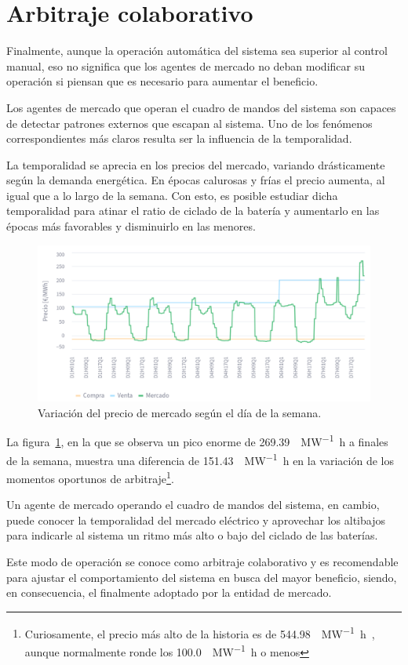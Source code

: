 \section{Arbitraje colaborativo}
\label{makereference7.5}

Finalmente, aunque la operación automática del sistema sea superior al control manual, eso no significa que los agentes de mercado no deban modificar su operación si piensan que es necesario para aumentar el beneficio.

Los agentes de mercado que operan el cuadro de mandos del sistema son capaces de detectar patrones externos que escapan al sistema. Uno de los fenómenos correspondientes más claros resulta ser la influencia de la temporalidad.

La temporalidad se aprecia en los precios del mercado, variando drásticamente según la demanda energética. En épocas calurosas y frías el precio aumenta, al igual que a lo largo de la semana. Con esto, es posible estudiar dicha temporalidad para atinar el ratio de ciclado de la batería y aumentarlo en las épocas más favorables y disminuirlo en las menores.

\begin{figure}
  \centering
  \includegraphics[width=0.75\linewidth]{figures/temporalidad-mercado.png}
  \caption[Variación del precio de mercado según el día de la semana.]{Variación del precio de mercado según el día de la semana.}
  \label{fig:temporalidad-mercado}
\end{figure}

La figura~\ref{fig:temporalidad-mercado}, en la que se observa un pico enorme de \SI{269.39}{\text{\euro}\per\mega\watt\hour} a finales de la semana, muestra una diferencia de \SI{151.43}{\text{\euro}\per\mega\watt\hour} en la variación de los momentos oportunos de arbitraje\footnote{Curiosamente, el precio más alto de la historia es de \SI{544.98}{\text{\euro}\per\mega\watt\hour}~\cite{ecoavant2025precio}, aunque normalmente ronde los \SI{100.0}{\text{\euro}\per\mega\watt\hour} o menos}.

Un agente de mercado operando el cuadro de mandos del sistema, en cambio, puede conocer la temporalidad del mercado eléctrico y aprovechar los altibajos para indicarle al sistema un ritmo más alto o bajo del ciclado de las baterías.

Este modo de operación se conoce como arbitraje colaborativo y es recomendable para ajustar el comportamiento del sistema en busca del mayor beneficio, siendo, en consecuencia, el finalmente adoptado por la entidad de mercado.
